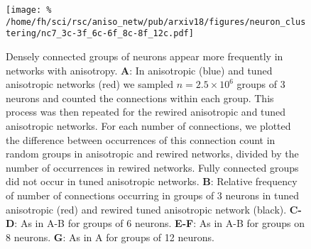
\begin{figure}[h!]
  \centering \texttt{[image: \%
    /home/fh/sci/rsc/aniso\_netw/pub/arxiv18/figures/neuron\_clustering/nc7\_3c-3f\_6c-6f\_8c-8f\_12c.pdf]}
  \caption{Densely connected groups of neurons appear more frequently
    in networks with anisotropy. \textbf{A}: In anisotropic (blue) and
    tuned anisotropic networks (red) we sampled $n=2.5 \times 10^6$
    groups of 3 neurons and counted the connections within each
    group. This process was then repeated for the rewired anisotropic
    and tuned anisotropic networks. For each number of connections, we
    plotted the difference between occurrences of this connection
    count in random groups in anisotropic and rewired networks,
    divided by the number of occurrences in rewired networks. Fully
    connected groups did not occur in tuned anisotropic
    networks. \textbf{B}: Relative frequency of number of connections
    occurring in groups of 3 neurons in tuned anisotropic (red) and
    rewired tuned anisotropic network (black). \textbf{C-D}: As in A-B
    for groups of 6 neurons. \textbf{E-F}: As in A-B for groups on 8
    neurons. \textbf{G}: As in A for groups of 12 neurons.}
\label{fig:neuron_clusters}
\end{figure}
